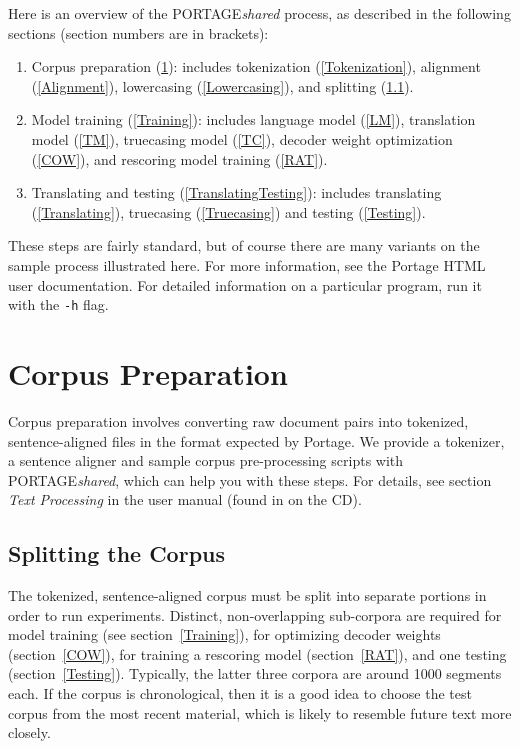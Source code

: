 \documentclass[11pt]{article}
\newcommand{\PS}{PORTAGE\emph{shared}\xspace}
\begin{document}
Here is an overview of the \PS process, as described in the following
sections (section numbers are in brackets):
\begin{enumerate}
\item Corpus preparation (\ref{CorpusPreparation}): includes tokenization
      (\ref{Tokenization}), alignment (\ref{Alignment}), lowercasing
      (\ref{Lowercasing}), and splitting (\ref{Splitting}).
\item Model training (\ref{Training}): includes language model (\ref{LM}),
      translation model (\ref{TM}), truecasing model (\ref{TC}), decoder weight
      optimization (\ref{COW}), and rescoring model training (\ref{RAT}).
\item Translating and testing (\ref{TranslatingTesting}): includes
      translating (\ref{Translating}), truecasing (\ref{Truecasing}) and
      testing (\ref{Testing}).
\end{enumerate}
These steps are fairly standard, but of course there are many variants on the
sample process illustrated here. For more information, see the Portage HTML
user documentation. For detailed information on a particular program, run it
with the {\tt -h} flag.

\section{Corpus Preparation} \label{CorpusPreparation}

Corpus preparation involves converting raw document pairs into tokenized,
sentence-aligned files in the format expected by Portage.  We provide a
tokenizer, a sentence aligner and sample corpus pre-processing scripts with
\PS, which can help you with these steps.  For details, see section \emph{Text
Processing} in the user manual (found in
 on the CD).

\subsection{Splitting the Corpus} \label{Splitting}

The tokenized, sentence-aligned corpus must be split into separate portions
in order to run experiments. Distinct, non-overlapping sub-corpora are required
for model training (see section~\ref{Training}), for optimizing decoder weights
(section~\ref{COW}), for training a rescoring model (section~\ref{RAT}), and
one  testing (section~\ref{Testing}). Typically, the latter three corpora are
around 1000 segments each.  If the corpus is chronological, then it is a good
idea to choose the test corpus from the most recent material, which is likely
to resemble future text more closely.
\end{document}
